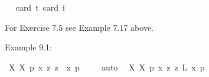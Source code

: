 \begin{isabellebody}
\ \ \isamarkupfalse%
{\isacharbrackleft}card\ {\isacharprime}t{\isacharequal}{}{\isacharcomma}\ card\ i{\isacharequal}{}{\isacharbrackright}%
\isadelimproof
\ %
\endisadelimproof
%
\isatagproof
{}\isamarkupfalse%
\ %
%
\endisatagproof
{\isafoldproof}%
%
\isadelimproof
%
\endisadelimproof
%
\begin{isamarkuptext}%
For Exercise 7.5 see Example 7.17 above.%
\end{isamarkuptext}\isamarkuptrue%
%
\isamarkuptrue%
%
\isamarkuptrue%
%
\begin{isamarkuptext}%
Example 9.1:%
\end{isamarkuptext}\isamarkuptrue%
\isamarkupfalse%
\ {\isachardoublequoteopen}{\isasymlfloor}{\isacharparenleft}{\isacharparenleft}{\isasymlambda}X{\isachardot}\ \isactrlbold {\isasymbox}{\isacharparenleft}X\ \isactrlbold {\isasymdownharpoonleft}{\isacharparenleft}p{\isacharcolon}{\isacharcolon}{\isasymup}{\isasymzero}{\isacharparenright}{\isacharparenright}{\isacharparenright}\ \isactrlbold {\isasymdown}{\isacharparenleft}{\isasymlambda}x{\isachardot}\ \isactrlbold {\isasymdiamond}{\isacharparenleft}{\isasymlambda}z{\isachardot}\ z\ \isactrlbold {\isasymapprox}\ x{\isacharparenright}\ \isactrlbold {\isasymdownharpoonleft}p{\isacharparenright}{\isacharparenright}{\isasymrfloor}{\isachardoublequoteclose}\ \isanewline
%
\isadelimproof
\ \ %
\endisadelimproof
%
\isatagproof
{}\isamarkupfalse%
\ auto\ %
%
\endisatagproof
{\isafoldproof}%
%
\isadelimproof
\isanewline
%
\endisadelimproof
{}\isamarkupfalse%
\ {\isachardoublequoteopen}{\isasymlfloor}{\isacharparenleft}{\isacharparenleft}{\isasymlambda}X{\isachardot}\ \isactrlbold {\isasymbox}{\isacharparenleft}X\ \isactrlbold {\isasymdownharpoonleft}{\isacharparenleft}p{\isacharcolon}{\isacharcolon}{\isasymup}{\isasymzero}{\isacharparenright}{\isacharparenright}{\isacharparenright}\ \isactrlbold {\isasymdown}{\isacharparenleft}{\isasymlambda}x{\isachardot}\ \isactrlbold {\isasymdiamond}{\isacharparenleft}{\isasymlambda}z{\isachardot}\ z\ \isactrlbold {\isasymapprox}\isactrlsup L\ x{\isacharparenright}\ \isactrlbold {\isasymdownharpoonleft}p{\isacharparenright}{\isacharparenright}{\isasymrfloor}{\isachardoublequoteclose}\ \isanewline
%
\isadelimproof
\ \ %
\endisadelimproof
%
\isatagproof
{}\isamarkupfalse%

\end{isabellebody}
